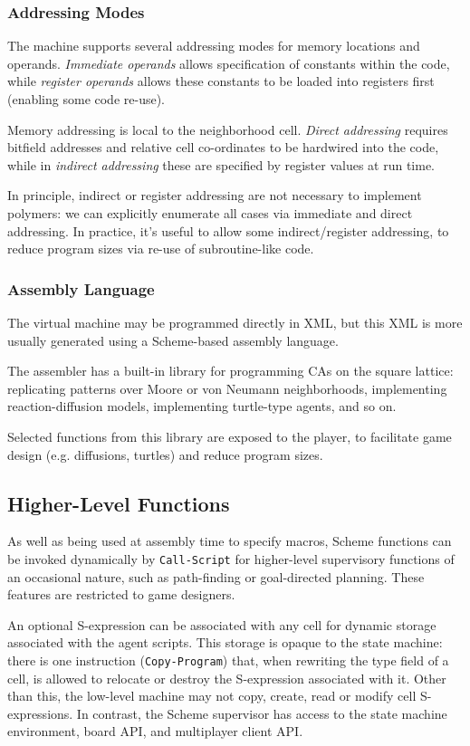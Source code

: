 \documentclass{acm_proc_article-sp}
\begin{document}
\subsubsection{Addressing Modes}

The machine supports several addressing modes for memory locations and operands.
{\em Immediate operands} allows specification of constants within the code,
while {\em register operands} allows these constants to be loaded into registers first (enabling some code re-use).

Memory addressing is local to the neighborhood cell.
{\em Direct addressing} requires bitfield addresses and relative cell co-ordinates to be hardwired into the code,
while in {\em indirect addressing} these are specified by register values at run time.

In principle, indirect or register addressing are not necessary to implement polymers:
we can explicitly enumerate all cases via immediate and direct addressing.
In practice, it's useful to allow some indirect/register addressing,
to reduce program sizes via re-use of subroutine-like code.

\subsubsection{Assembly Language}

The virtual machine may be programmed directly in XML, but this XML is more usually generated using
a Scheme-based assembly language.

The assembler has a built-in library for programming CAs on the square lattice:
replicating patterns over Moore or von Neumann neighborhoods,
implementing reaction-diffusion models, implementing turtle-type agents, and so on.

Selected functions from this library are exposed to the player,
to facilitate game design (e.g. diffusions, turtles) and reduce program sizes.

\subsection{Higher-Level Functions}

As well as being used at assembly time to specify macros,
Scheme functions can be invoked dynamically by {\tt Call-Script}
for higher-level supervisory functions of an occasional nature,
such as path-finding or goal-directed planning.
These features are restricted to game designers.

An optional S-expression can be associated with any cell for dynamic storage associated with the agent scripts.
This storage is opaque to the state machine: there is one instruction ({\tt Copy-Program}) that, when rewriting the type field of a cell, is allowed to relocate or destroy the S-expression associated with it.
Other than this, the low-level machine may not copy, create, read or modify cell S-expressions.
In contrast, the Scheme supervisor has access to the state machine environment, board API, and multiplayer client API.
\end{document}
